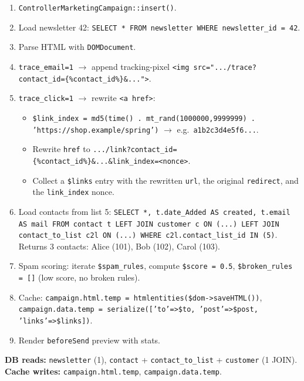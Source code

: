 \documentclass[11pt,a4paper]{article}
\begin{document}
\begin{enumerate}[leftmargin=1.6em,itemsep=2pt]
  \item \texttt{ControllerMarketingCampaign::insert()}.
  \item Load newsletter 42: \texttt{SELECT * FROM newsletter
        WHERE newsletter\_id = 42}.
  \item Parse HTML with \texttt{DOMDocument}.
  \item \texttt{trace\_email=1} $\to$ append tracking-pixel
        \texttt{<img src=".../trace?contact\_id=\{\%contact\_id\%\}\&...">}.
  \item \texttt{trace\_click=1} $\to$ rewrite \texttt{<a href>}:
        \begin{itemize}[itemsep=2pt]
          \item \texttt{\$link\_index = md5(time() . mt\_rand(1000000,9999999) . 'https://shop.example/spring')}
                $\to$ e.g.\ \texttt{a1b2c3d4e5f6...}.
          \item Rewrite \texttt{href} to
                \texttt{.../link?contact\_id=\{\%contact\_id\%\}\&...\&link\_index=<nonce>}.
          \item Collect a \texttt{\$links} entry with the rewritten
                \texttt{url}, the original \texttt{redirect}, and the
                \texttt{link\_index} nonce.
        \end{itemize}
  \item Load contacts from list 5: \texttt{SELECT *, t.date\_Added
        AS created, t.email AS mail FROM contact t LEFT JOIN
        customer c ON (...) LEFT JOIN contact\_to\_list c2l ON
        (...) WHERE c2l.contact\_list\_id IN (5)}. Returns 3
        contacts: Alice (101), Bob (102), Carol (103).
  \item Spam scoring: iterate \texttt{\$spam\_rules}, compute
        \texttt{\$score = 0.5}, \texttt{\$broken\_rules = []}
        (low score, no broken rules).
  \item Cache: \texttt{campaign.html.temp = htmlentities(\$dom->saveHTML())},
        \texttt{campaign.data.temp = serialize(['to'=>\$to, 'post'=>\$post, 'links'=>\$links])}.
  \item Render \texttt{beforeSend} preview with stats.
\end{enumerate}

\textbf{DB reads:} \texttt{newsletter} (1), \texttt{contact} +
\texttt{contact\_to\_list} + \texttt{customer} (1 JOIN).
\textbf{Cache writes:} \texttt{campaign.html.temp},
\texttt{campaign.data.temp}.
\end{document}

